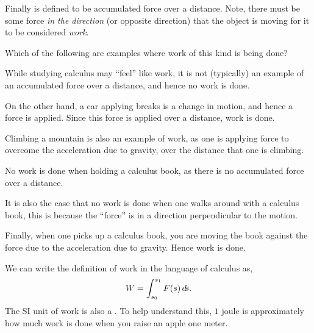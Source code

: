 \documentclass{ximera}
\begin{document}
Finally  is defined to be accumulated force over a
distance. Note, there must be some force \textit{in the direction} (or
opposite direction) that the object is moving for it to be considered
\textit{work}.
\begin{question}
  Which of the following are examples where work of this kind is being done?
  \begin{selectAll}
  \end{selectAll}
  \begin{feedback}
    While studying calculus may ``feel'' like work, it is not
    (typically) an example of an accumulated force over a distance,
    and hence no work is done.

    On the other hand, a car applying breaks is a change in motion, and
    hence a force is applied. Since this force is applied over a
    distance, work is done.

    Climbing a mountain is also an example of work, as one is applying
    force to overcome the acceleration due to gravity, over the
    distance that one is climbing.

    No work is done when holding a calculus book, as there is no
    accumulated force over a distance.

    It is also the case that no work is done when one walks around
    with a calculus book, this is because the ``force'' is in a
    direction perpendicular to the motion.

    Finally, when one picks up a calculus book, you are moving the
    book against the force due to the acceleration due to
    gravity. Hence work is done.
  \end{feedback}
\end{question}
We can write the definition of work in the language of calculus as,
\[
W = \int_{s_0}^{s_1} F(s) \mathop{}\!d\! s.
\]
The SI unit of work is also a . To help understand this,
$1$ joule is approximately how much work is done when you raise an
apple one meter.
\end{document}
